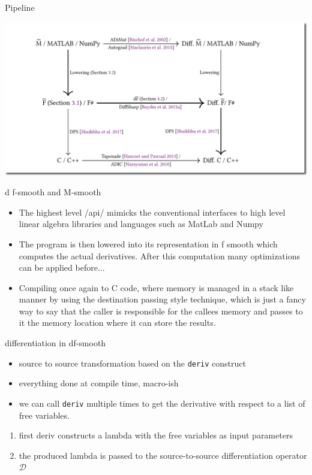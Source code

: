 \documentclass[smaller]{beamer}
\begin{document}
\begin{frame}{Pipeline}
\begin{center}
\includegraphics[width=.9\linewidth]{pipeline.png}
\end{center}
\end{frame}


\begin{frame}{d f-smooth and M-smooth}

  \begin{itemize}
    \item The highest level /api/ mimicks the conventional
      interfaces to high level linear algebra libraries and
      languages such as MatLab and Numpy

    \item The program is then lowered into its representation in
      f smooth which computes the actual derivatives. After this computation
      many optimizations can be applied before...

    \item  Compiling once again to C code, where memory is managed in a
      stack like manner by using the destination passing style technique,
      which is just a fancy way to say that the caller is responsible for
      the callees memory and passes to it the memory location where it can
      store the results.

  \end{itemize}

\end{frame}

\begin{frame}{differentiation in df-smooth }

  \begin{itemize}
    \item source to source transformation based on the \texttt{deriv} construct
    \item everything done at compile time, macro-ish
    \item we can call \texttt{deriv} multiple times to get the derivative with respect
      to a list of free variables.
  \end{itemize}
  \begin{enumerate}
    \item first deriv constructs a lambda with the free variables as input parameters
    \item the produced lambda is passed to the source-to-source differentiation
      operator $ \mathcal D $
  \end{enumerate}

\end{frame}
\end{document}
